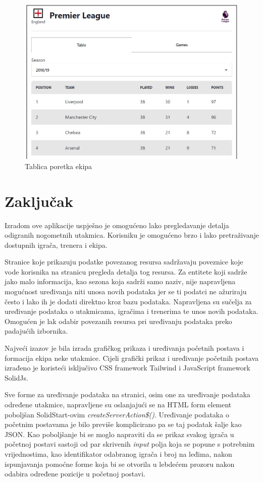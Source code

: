 \documentclass[times, utf8, zavrsni]{fer}
\begin{document}
\begin{figure}[htb]
\centering
\includegraphics[width=14cm]{images/table.jpg}
\caption{Tablica poretka ekipa}
\label{fig:table}
\end{figure}

\chapter{Zaključak}

Izradom ove aplikacije uspješno je omogućeno lako pregledavanje detalja odigranih nogometnih utakmica.
Korisniku je omogućeno brzo i lako pretraživanje dostupnih igrača, trenera i ekipa.

Stranice koje prikazuju podatke povezanog resursa sadržavaju poveznice koje vode korisnika na stranicu pregleda detalja tog resursa.
Za entitete koji sadrže jako malo informacija, kao sezona koja sadrži samo naziv, nije napravljena mogućnost uređivanja niti unosa novih podataka jer se ti podatci ne ažuriraju često i lako ih je dodati direktno kroz bazu podataka.
Napravljena su sučelja za uređivanje podataka o utakmicama, igračima i trenerima te unos novih podataka.
Omogućen je lak odabir povezanih resursa pri uređivanju podataka preko padajućih izbornika.

Najveći izazov je bila izrada grafičkog prikaza i uređivanja početnih postava i formacija ekipa neke utakmice.
Cijeli grafički prikaz i uređivanje početnih postava izrađeno je koristeći isključivo CSS framework Tailwind i JavaScript framework SolidJs.

Sve forme za uređivanje podataka na stranici, osim one za uređivanje podataka određene utakmice, napravljene su oslanjajući se na HTML form element poboljšan SolidStart-ovim \emph{createServerAction\$()}.
Uređivanje podataka o početnim postavama je bilo previše komplicirano pa se taj podatak šalje kao JSON.
Kao poboljšanje bi se moglo napraviti da se prikaz svakog igrača u početnoj postavi sastoji od par skrivenih \emph{input} polja koja se popune s potrebnim vrijednostima, kao identifikator odabranog igrača i broj na leđima,
nakon ispunjavanja pomoćne forme koja bi se otvorila u lebdećem prozoru nakon odabira određene pozicije u početnoj postavi.
\end{document}
